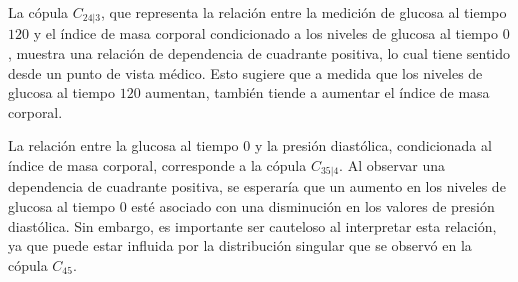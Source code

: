 La cópula $C_{24|3}$, que representa la relación entre la medición de glucosa al tiempo $120$ y el índice de masa corporal condicionado a los niveles de glucosa al tiempo $0$, muestra una relación de dependencia de cuadrante positiva, lo cual tiene sentido desde un punto de vista médico. Esto sugiere que a medida que los niveles de glucosa al tiempo $120$ aumentan, también tiende a aumentar el índice de masa corporal.

La relación entre la glucosa al tiempo $0$ y la presión diastólica, condicionada al índice de masa corporal, corresponde a la cópula $C_{35|4}$. Al observar una dependencia de cuadrante positiva, se esperaría que un aumento en los niveles de glucosa al tiempo $0$ esté asociado con una disminución en los valores de presión diastólica. Sin embargo, es importante ser cauteloso al interpretar esta relación, ya que puede estar influida por la distribución singular que se observó en la cópula $C_{45}$.


\begin{figure}[H]
 \centering
\end{figure}

